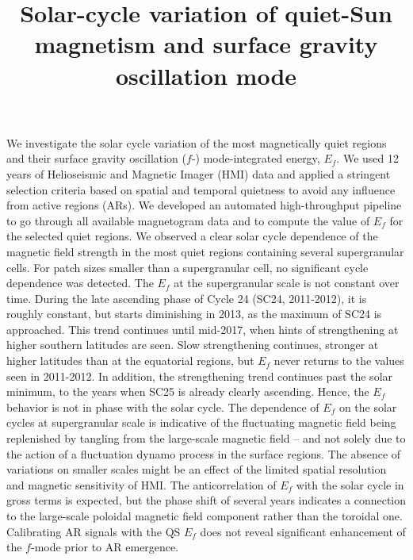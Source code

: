 \documentclass{aa}
\begin{document}
\title{Solar-cycle variation of quiet-Sun magnetism and surface gravity oscillation mode}



{We investigate the solar cycle variation of the most magnetically quiet regions and
their surface gravity oscillation ($f$-) mode-integrated 
energy, $E_f$.
}
{We used 12 years of Helioseismic and Magnetic Imager (HMI) data and applied a stringent selection criteria based on
spatial and temporal quietness to avoid any influence from active regions (ARs).
We developed an automated high-throughput pipeline to go through all available magnetogram data
and to compute the value of 
$E_f$
for the selected quiet regions.}
{We observed a clear solar cycle dependence of the magnetic field strength in the most
quiet regions containing several supergranular cells. For patch sizes smaller than a supergranular
cell, no significant cycle dependence was detected. The $E_f$ at the supergranular scale 
is not constant over time.
During the late ascending phase of Cycle 24 (SC24, 2011-2012), it is roughly constant, but starts diminishing in 2013, as the maximum of SC24 is approached. This trend continues
until 
mid-2017,
when
hints of strengthening at higher southern latitudes
are seen.
Slow strengthening continues, stronger at higher latitudes than at the equatorial regions, but $E_f$ never returns to the values seen in 2011-2012. In addition, the strengthening trend continues past the solar minimum, to the years when SC25 is already clearly ascending. Hence, the $E_f$ behavior is not in phase with the solar cycle.
}
{
The dependence of $E_f$ on the solar cycles at supergranular scale
is indicative of the fluctuating magnetic
field being replenished by tangling from the large-scale magnetic field -- and not solely due to
the action of a fluctuation dynamo process in the surface regions. 
The absence of variations on smaller scales might be an effect of the
limited spatial resolution and magnetic sensitivity of HMI.
The 
anticorrelation of $E_f$ with the solar cycle in gross terms is expected, but the phase shift of several years indicates a connection to the large-scale poloidal magnetic field component rather than the toroidal one. Calibrating AR signals with the QS $E_f$ does not reveal significant enhancement of the $f$-mode prior to AR emergence.
}
\end{document}
